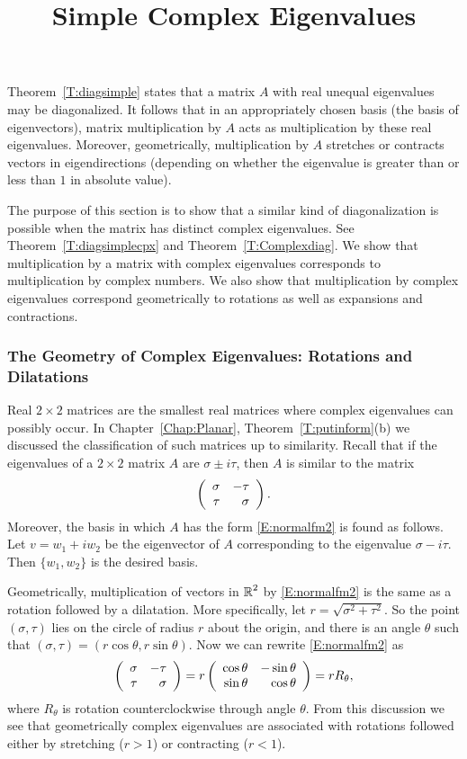 \documentclass{ximera}
\title{Simple Complex Eigenvalues}
\begin{document}
\begin{abstract}
\end{abstract}
\maketitle

  \label{S:CSE}

Theorem~\ref{T:diagsimple} states that a matrix $A$ with real
unequal eigenvalues may be diagonalized. It follows that 
in an appropriately chosen basis (the basis of eigenvectors), 
matrix multiplication by $A$ acts 
as multiplication by these real eigenvalues.  Moreover, geometrically, 
multiplication by $A$ stretches or contracts vectors in 
eigendirections (depending on whether the eigenvalue is greater
than or less than $1$ in absolute value).

The purpose of this section is to show that a similar kind of diagonalization 
is possible when the matrix has distinct complex eigenvalues. See
Theorem~\ref{T:diagsimplecpx} and Theorem~\ref{T:Complexdiag}.  We show 
that multiplication by a matrix with complex eigenvalues corresponds
to multiplication by complex numbers.  We also show that multiplication by 
complex eigenvalues correspond geometrically to rotations 
as well as expansions and contractions.

\subsubsection*{The Geometry of Complex Eigenvalues: Rotations and
Dilatations}

Real $2\times 2$ matrices are the smallest real matrices where complex 
eigenvalues can possibly occur.  In Chapter~\ref{Chap:Planar}, 
Theorem~\ref{T:putinform}(b) we discussed the classification of such matrices 
up to similarity.  Recall that if the eigenvalues of a $2\times 2$ matrix $A$ 
are $\sigma\pm i\tau$, 
then $A$ is similar to the matrix 
\begin{equation} \label{E:normalfm2}
\left(\begin{array}{rr} \sigma & -\tau\\ \tau &\sigma\end{array}\right).
\end{equation}
Moreover, the basis in which $A$ has the form \eqref{E:normalfm2} is found
as follows.  Let $v=w_1+iw_2$ be the eigenvector of $A$ corresponding to 
the eigenvalue $\sigma-i\tau$.  Then $\{w_1,w_2\}$ is the desired 
basis.

Geometrically, multiplication of vectors in $\mbox{$\mathbb{R}$}^2$ by \eqref{E:normalfm2} is 
the same as a rotation followed by a dilatation.  More 
specifically, let $r=\sqrt{\sigma^2+\tau^2}$.  So the point $(\sigma,\tau)$ 
lies on the circle of radius $r$ about the origin, and there is an angle 
$\theta$ such that $(\sigma,\tau)=(r\cos\theta,r\sin\theta)$.  Now we can 
rewrite \eqref{E:normalfm2} as
\[
\left(\begin{array}{rr} \sigma & -\tau\\ \tau &\sigma\end{array}\right)
= r\left(\begin{array}{rr} \cos\theta & -\sin{\theta}\\ \sin\theta &\cos\theta\end{array}\right)=rR_{\theta},
\]
where $R_\theta$ is rotation counterclockwise through angle $\theta$.  From 
this discussion we see that geometrically complex eigenvalues are associated 
with rotations followed either by stretching ($r>1$) or contracting ($r<1$).
\end{document}
